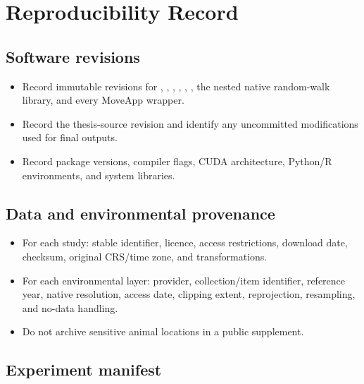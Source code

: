 \chapter{Reproducibility Record}
\label{app:reproducibility}

\section{Software revisions}

\begin{itemize}
  \item Record immutable revisions for , , , , , , the nested native random-walk library, and every MoveApp wrapper.
  \item Record the thesis-source revision and identify any uncommitted modifications used for final outputs.
  \item Record package versions, compiler flags, CUDA architecture, Python/R environments, and system libraries.
\end{itemize}

\section{Data and environmental provenance}

\begin{itemize}
  \item For each study: stable identifier, licence, access restrictions, download date, checksum, original CRS/time zone, and transformations.
  \item For each environmental layer: provider, collection/item identifier, reference year, native resolution, access date, clipping extent, reprojection, resampling, and no-data handling.
  \item Do not archive sensitive animal locations in a public supplement.
\end{itemize}

\section{Experiment manifest}

